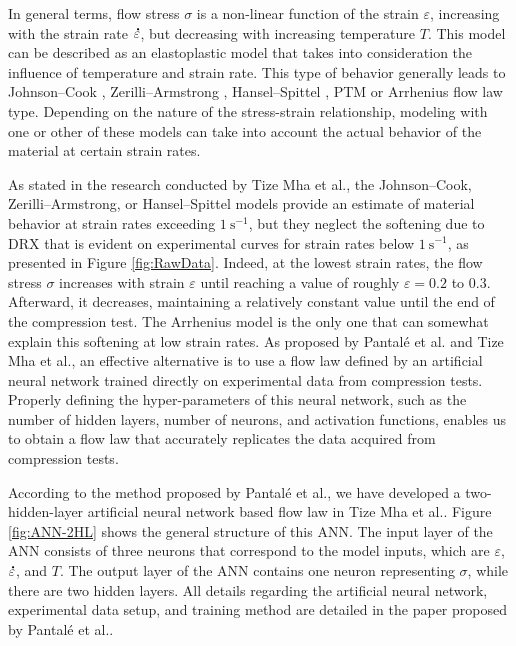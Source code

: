 \documentclass[metals,article,submit,pdftex,moreauthors]{Definitions/mdpi}
\makeatletter
\DeclareRobustCommand{\mdot}[1]{\accentset{\mbox{\bfseries .}}{#1}}
\DeclareRobustCommand{\eal}{et al.\@\xspace}
\DeclareRobustCommand{\ps}{\text{s}^{-1}}
\makeatother
\begin{document}
In general terms, flow stress $\sigma$ is a non-linear function of the strain $\varepsilon$, increasing with the strain rate $\mdot\varepsilon$, but decreasing with increasing temperature $T$.
This model can be described as an elastoplastic model that takes into consideration the influence of temperature and strain rate.
This type of behavior generally leads to Johnson--Cook \cite{Johnson-1983}, Zerilli--Armstrong \cite{Zerilli-1987}, Hansel--Spittel \cite{Hensel-1978}, PTM \cite{TizeMha-2023} or Arrhenius \cite{Sellars-1966} flow law type.
Depending on the nature of the stress-strain relationship, modeling with one or other of these models can take into account the actual behavior of the material at certain strain rates.

As stated in the research conducted by Tize Mha \eal \cite{TizeMha-2023}, the Johnson--Cook, Zerilli--Armstrong, or Hansel--Spittel models provide an estimate of material behavior at strain rates exceeding $1~\ps$, but they neglect the softening due to DRX that is evident on experimental curves for strain rates below $1~\ps$, as presented in Figure \ref{fig:RawData}.
Indeed, at the lowest strain rates, the flow stress $\sigma$ increases with strain $\varepsilon$ until reaching a value of roughly $\varepsilon=0.2$ to $0.3$.
Afterward, it decreases, maintaining a relatively constant value until the end of the compression test.
The Arrhenius model is the only one that can somewhat explain this softening at low strain rates.
As proposed by Pantalé \eal \cite{Pantale-2021} and Tize Mha \eal \cite{TizeMha-2023}, an effective alternative is to use a flow law defined by an artificial neural network trained directly on experimental data from compression tests.
Properly defining the hyper-parameters of this neural network, such as the number of hidden layers, number of neurons, and activation functions, enables us to obtain a flow law that accurately replicates the data acquired from compression tests.

According to the method proposed by Pantalé \eal \cite{Pantale-2021}, we have developed a two-hidden-layer artificial neural network based flow law in Tize Mha \eal \cite{TizeMha-2023}.
Figure \ref{fig:ANN-2HL} shows the general structure of this ANN.
The input layer of the ANN consists of three neurons that correspond to the model inputs, which are $\varepsilon$, $\mdot\varepsilon$, and $T$.
The output layer of the ANN contains one neuron representing $\sigma$, while there are two hidden layers.
All details regarding the artificial neural network, experimental data setup, and training method are detailed in the paper proposed by Pantalé \eal \cite{Pantale-2021}.
\end{document}

